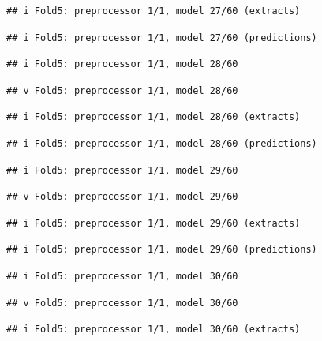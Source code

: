 \documentclass[
]{article}
\begin{document}
\begin{verbatim}
## i Fold5: preprocessor 1/1, model 27/60 (extracts)
\end{verbatim}

\begin{verbatim}
## i Fold5: preprocessor 1/1, model 27/60 (predictions)
\end{verbatim}

\begin{verbatim}
## i Fold5: preprocessor 1/1, model 28/60
\end{verbatim}

\begin{verbatim}
## v Fold5: preprocessor 1/1, model 28/60
\end{verbatim}

\begin{verbatim}
## i Fold5: preprocessor 1/1, model 28/60 (extracts)
\end{verbatim}

\begin{verbatim}
## i Fold5: preprocessor 1/1, model 28/60 (predictions)
\end{verbatim}

\begin{verbatim}
## i Fold5: preprocessor 1/1, model 29/60
\end{verbatim}

\begin{verbatim}
## v Fold5: preprocessor 1/1, model 29/60
\end{verbatim}

\begin{verbatim}
## i Fold5: preprocessor 1/1, model 29/60 (extracts)
\end{verbatim}

\begin{verbatim}
## i Fold5: preprocessor 1/1, model 29/60 (predictions)
\end{verbatim}

\begin{verbatim}
## i Fold5: preprocessor 1/1, model 30/60
\end{verbatim}

\begin{verbatim}
## v Fold5: preprocessor 1/1, model 30/60
\end{verbatim}

\begin{verbatim}
## i Fold5: preprocessor 1/1, model 30/60 (extracts)
\end{verbatim}
\end{document}
